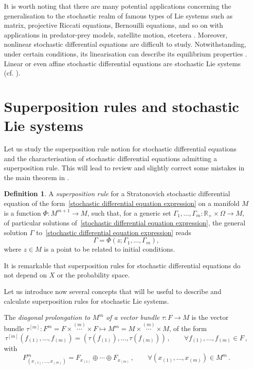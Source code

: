\documentclass[11pt]{article}
\theoremstyle{plain}
\theoremstyle{definition}
\newtheorem{definition}[theorem]{Definition}
\begin{document}
It is worth noting that there are many potential applications concerning the generalisation to the stochastic realm of famous types of Lie systems such as matrix, projective Riccati equations, Bernouilli equations, and so on with applications in predator-prey models, satellite motion, etcetera \cite{Ar03,Sa70}.  Moreover, nonlinear stochastic differential equations are difficult to study. Notwithstanding, under certain conditions, its linearisation can describe its equilibrium properties \cite{Ar03}. Linear or even affine stochastic differential equations are stochastic Lie systems (cf. \cite{LO09}).

\section{Superposition rules and stochastic Lie systems}\label{Sec:SSRandLT}

Let us study the superposition rule notion for stochastic differential equations and the characterisation of stochastic differential equations admitting a superposition rule. This will lead to review and slightly correct some mistakes in the main theorem in \cite{LO09}. 

\begin{definition}\label{def 1}
    A {\it superposition rule} for a Stratonovich stochastic differential equation of the form~\eqref{stochastic differential equation expression} on a manifold $M$ is a function $\Phi: M^{m + 1} \to M$, such that, for a generic set $\Gamma_1, \ldots, \Gamma_m:\mathbb{R}_+\times \Omega\rightarrow M$, of particular solutions of~\eqref{stochastic differential equation expression}, the general solution $\Gamma$ to~\eqref{stochastic differential equation expression} reads
    \[ \Gamma = \Phi (z
    ; \Gamma_1, \ldots, \Gamma_m), \]
    where $z\in M$ is a point to be related to initial conditions. %
\end{definition}

It is remarkable that superposition rules for stochastic differential equations do not depend on $X$ or the probability space. 

Let us introduce now several concepts that will be useful to describe and calculate superposition rules for stochastic Lie systems.

The {\it diagonal prolongation to $M^m$ of a vector bundle} $\tau:F\to M$  is the vector bundle $\tau^{[m]}:F^m = F\times\overset{(m)}{\dotsb}\times F\mapsto M^m= M\times \overset{(m)}{\dotsb} \times M$, of the form
\begin{equation*}
   \tau^{[m]}(f_{(1)},\dotsc,f_{(m)}) = (\tau(f_{(1)}),\dotsc,\tau(f_{(m)}))\,,\qquad \forall f_{(1)},\ldots,f_{(m)}\in F\,, 
\end{equation*}
with
\begin{equation}\label{Eq:Fiber}    F^m_{(x_{(1)},\ldots,x_{(m)})}=F_{x_{(1)}}\oplus\cdots\oplus F_{x_{(m)}}\,,\qquad \forall (x_{(1)},\ldots,x_{(m)})\in M^m\,.
\end{equation}
\end{document}

